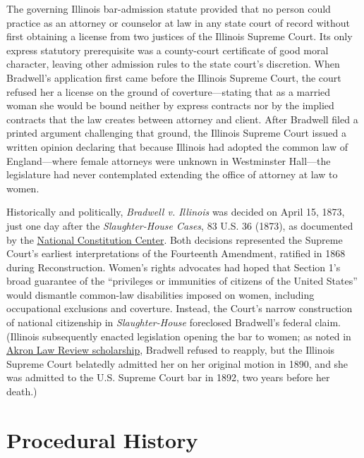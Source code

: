 \documentclass[12pt]{article}
\begin{document}
The governing Illinois bar-admission statute provided that no person could practice as an attorney or counselor at law in any state court of record without first obtaining a license from two justices of the Illinois Supreme Court. Its only express statutory prerequisite was a county-court certificate of good moral character, leaving other admission rules to the state court's discretion. When Bradwell's application first came before the Illinois Supreme Court, the court refused her a license on the ground of coverture---stating that as a married woman she would be bound neither by express contracts nor by the implied contracts that the law creates between attorney and client. After Bradwell filed a printed argument challenging that ground, the Illinois Supreme Court issued a written opinion declaring that because Illinois had adopted the common law of England---where female attorneys were unknown in Westminster Hall---the legislature had never contemplated extending the office of attorney at law to women.

Historically and politically, \textit{Bradwell v. Illinois} was decided on April 15, 1873, just one day after the \textit{Slaughter-House Cases}, 83 U.S. 36 (1873), as documented by the \href{https://constitutioncenter.org/the-constitution/supreme-court-case-library/bradwell-v-illinois-1873}{National Constitution Center}. Both decisions represented the Supreme Court's earliest interpretations of the Fourteenth Amendment, ratified in 1868 during Reconstruction. Women's rights advocates had hoped that Section 1's broad guarantee of the ``privileges or immunities of citizens of the United States'' would dismantle common-law disabilities imposed on women, including occupational exclusions and coverture. Instead, the Court's narrow construction of national citizenship in \textit{Slaughter-House} foreclosed Bradwell's federal claim. (Illinois subsequently enacted legislation opening the bar to women; as noted in \href{https://ideaexchange.uakron.edu/cgi/viewcontent.cgi?article=1164&context=akronlawreview}{Akron Law Review scholarship}, Bradwell refused to reapply, but the Illinois Supreme Court belatedly admitted her on her original motion in 1890, and she was admitted to the U.S. Supreme Court bar in 1892, two years before her death.)

\section{Procedural History}
\end{document}
